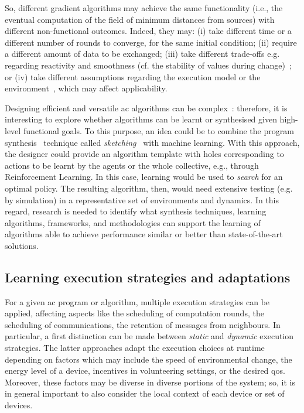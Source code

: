 So, different gradient algorithms may achieve the same functionality (i.e., the eventual computation of the field of minimum distances from sources)
 with different non-functional outcomes.
%
Indeed, they may:
 (i) take different time or a different number of rounds to converge, for the same initial condition;
 (ii) require a different amount of data to be exchanged;
 (iii) take different trade-offs e.g. regarding reactivity and smoothness (cf. the stability of values during change)~\cite{DBLP:journals/cee/AudritoCDPV21,DBLP:conf/saso/AudritoCDV17};
 or 
 (iv) take different assumptions regarding the execution model or the environment~\cite{DBLP:journals/cee/AudritoCDPV21}, which may affect applicability.

Designing efficient and versatile \ac{ac} algorithms can be complex~\cite{DBLP:journals/cee/AudritoCDPV21,DBLP:conf/saso/AudritoCDV17}: therefore, 
 it is interesting to explore
 whether algorithms can be learnt or synthesised
 given high-level functional goals.
%
To this purpose,
 an idea could be to combine
 the program synthesis~\cite{DBLP:journals/ftpl/GulwaniPS17} technique called \emph{sketching}~\cite{solar2008program-synthesis-sketching}
 with machine learning.
%
With this approach,
 the designer could provide an algorithm template
 with holes corresponding to actions
 to be learnt by the agents or the whole collective,
 e.g., through Reinforcement Learning.
%
In this case, learning would be used to \emph{search}
 for an optimal policy.
%
The resulting algorithm, then, would need extensive testing (e.g. by simulation) in a representative set of environments and dynamics.
%
In this regard, research is needed to identify what synthesis techniques, learning algorithms, frameworks, and methodologies can support the learning of algorithms able to achieve performance similar or better than state-of-the-art solutions.

\subsection{Learning execution strategies and adaptations}

For a given \ac{ac} program or algorithm,
  multiple execution strategies can be applied,
  affecting aspects like
  the scheduling of computation rounds,
  the scheduling of communications,
  the retention of messages from neighbours.
%
In particular,
 a first distinction 
 can be made between \emph{static}
 and \emph{dynamic} execution strategies.
%
The latter approaches adapt the execution choices
 at runtime depending on factors
 which may include
 the speed of environmental change,
 the energy level of a device,
 incentives in volunteering settings,
 or the desired \ac{qos}.
%
Moreover, these factors may be diverse 
 in diverse portions of the system;
 so, it is in general important to also consider
 the local context of each device or set of devices.

